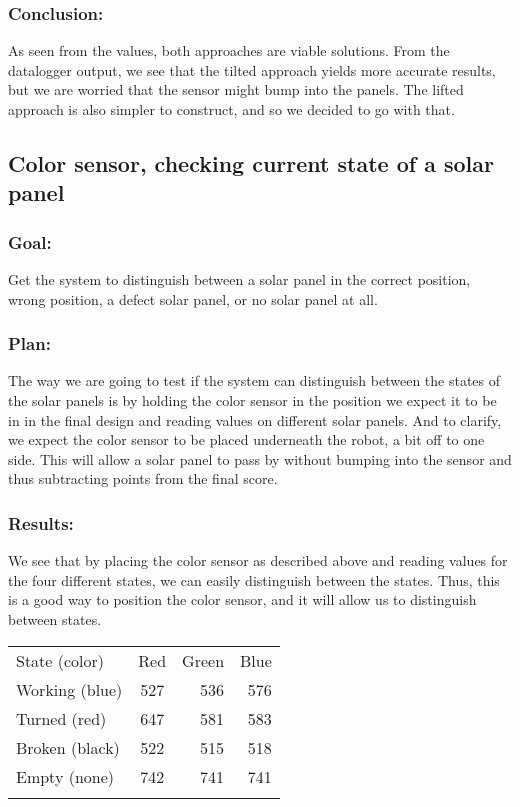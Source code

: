 \subsubsection{Conclusion:}
As seen from the values, both approaches are
viable solutions. From the datalogger output, we see that the tilted
approach yields more accurate results, but we are worried that the
sensor might bump into the panels. The lifted approach is also simpler
to construct, and so we decided to go with that.

\subsection{Color sensor, checking current state of a solar panel}

\subsubsection{Goal:}
Get the system to distinguish between a solar panel in
the correct position, wrong position, a defect solar panel, or no solar
panel at all.

\subsubsection{Plan:}
The way we are going to test if the
system can distinguish between the states of the solar panels is by
holding the color sensor in the position we expect it to be in in the
final design and reading values on different solar panels.
And to
clarify, we expect the color sensor to be placed underneath the robot, a
bit off to one side. This will allow a solar panel to pass by without
bumping into the sensor and thus subtracting points from the final
score.

\subsubsection{Results:}
We see that by placing the
color sensor as described above and reading values for the four
different states, we can easily distinguish between the states. Thus,
this is a good way to position the color sensor, and it will allow us to
distinguish between states.

\begin{longtable}[c]{@{}lcrr@{}}
\hline\noalign{\medskip}
State (color) & Red & Green & Blue
\\\noalign{\medskip}
\hline\noalign{\medskip}
Working (blue) & 527 & 536 & 576
\\\noalign{\medskip}
Turned (red) & 647 & 581 & 583
\\\noalign{\medskip}
Broken (black) & 522 & 515 & 518
\\\noalign{\medskip}
Empty (none) & 742 & 741 & 741
\\\noalign{\medskip}
\hline
\end{longtable}

